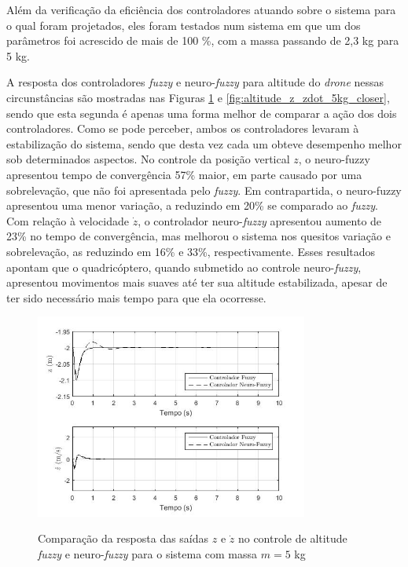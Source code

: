 Além da verificação da eficiência dos controladores atuando sobre o sistema para o qual foram projetados, eles foram testados num sistema em que um dos parâmetros foi acrescido de mais de 100 \%, com a massa passando de 2,3 kg para 5 kg.

A resposta dos controladores \textit{fuzzy} e neuro-\textit{fuzzy} para altitude do \textit{drone} nessas circunstâncias são mostradas nas Figuras \ref{fig:altitude_z_zdot_5kg} e \ref{fig:altitude_z_zdot_5kg_closer}, sendo que esta segunda é apenas uma forma melhor de comparar a ação dos dois controladores. Como se pode perceber, ambos os controladores levaram à estabilização do sistema, sendo que desta vez cada um obteve desempenho melhor sob determinados aspectos. No controle da posição vertical $z$, o neuro-fuzzy apresentou tempo de convergência 57\% maior, em parte causado por uma sobrelevação, que não foi apresentada pelo \textit{fuzzy}. Em contrapartida, o neuro-fuzzy apresentou uma menor variação, a reduzindo em 20\% se comparado ao \textit{fuzzy}. Com relação à velocidade $\dot{z}$, o controlador neuro-\textit{fuzzy} apresentou aumento de 23\% no tempo de convergência, mas melhorou o sistema nos quesitos variação e sobrelevação, as reduzindo em 16\% e 33\%, respectivamente. Esses resultados apontam que o quadricóptero, quando submetido ao controle neuro-\textit{fuzzy}, apresentou movimentos mais suaves até ter sua altitude estabilizada, apesar de ter sido necessário mais tempo para que ela ocorresse.

\begin{figure}[!htb]
    \centering
    \caption{Comparação da resposta das saídas $z$ e $\dot{z}$ no controle de altitude \textit{fuzzy} e neuro-\textit{fuzzy} para o sistema com massa $m=5$ kg}
    \includegraphics[width=0.8\textwidth]{./04-figuras/figuras_pos_banca/6-altitude5kg/graph_z_zdot_5kg}
    \label{fig:altitude_z_zdot_5kg}
\end{figure}

